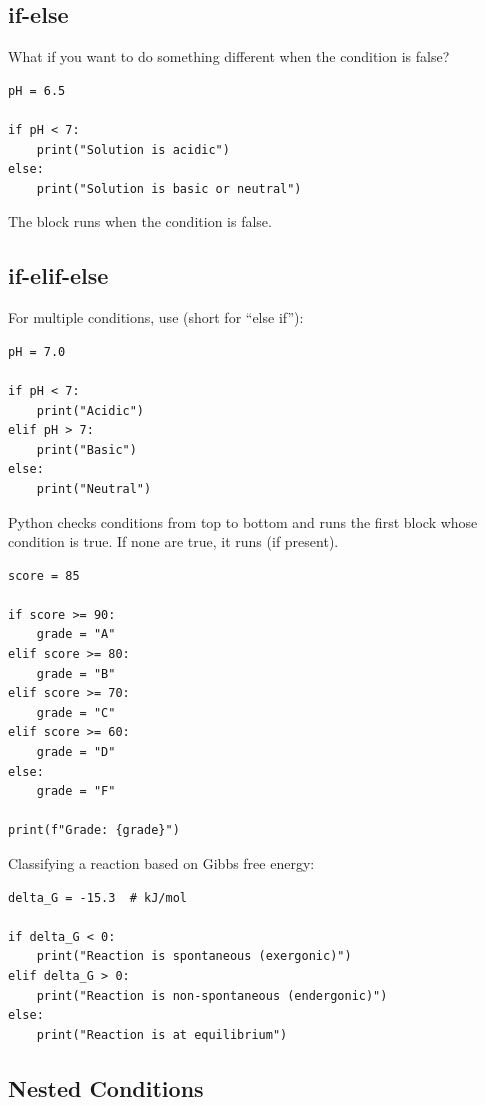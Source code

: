 \subsection{if-else}

What if you want to do something different when the condition is false?

\begin{lstlisting}
pH = 6.5

if pH < 7:
    print("Solution is acidic")
else:
    print("Solution is basic or neutral")
\end{lstlisting}

The  block runs when the  condition is false.

\subsection{if-elif-else}

For multiple conditions, use  (short for ``else if''):

\begin{lstlisting}
pH = 7.0

if pH < 7:
    print("Acidic")
elif pH > 7:
    print("Basic")
else:
    print("Neutral")
\end{lstlisting}

Python checks conditions from top to bottom and runs the first block whose condition is true. If none are true, it runs  (if present).

\begin{lstlisting}
score = 85

if score >= 90:
    grade = "A"
elif score >= 80:
    grade = "B"
elif score >= 70:
    grade = "C"
elif score >= 60:
    grade = "D"
else:
    grade = "F"

print(f"Grade: {grade}")
\end{lstlisting}

\begin{labexample}
Classifying a reaction based on Gibbs free energy:

\begin{lstlisting}
delta_G = -15.3  # kJ/mol

if delta_G < 0:
    print("Reaction is spontaneous (exergonic)")
elif delta_G > 0:
    print("Reaction is non-spontaneous (endergonic)")
else:
    print("Reaction is at equilibrium")
\end{lstlisting}
\end{labexample}

\subsection{Nested Conditions}

